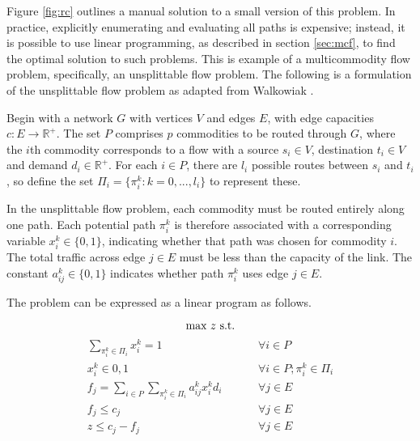 Figure \ref{fig:rc} outlines a manual solution to a small version of this problem. In practice, explicitly enumerating and evaluating all paths is expensive; instead, it is possible to use linear programming, as described in section \ref{sec:mcf}, to find the optimal solution to such problems. This is example of a multicommodity flow problem, specifically, an unsplittable flow problem. The following is a formulation of the unsplittable flow problem as adapted from Walkowiak \cite{walkowiak:residual}. 

Begin with a network $G$ with vertices $V$ and edges $E$, with edge capacities $c : E \rightarrow \mathbb{R}^+$. The set $P$ comprises $p$ commodities to be routed through $G$, where the $i$th commodity corresponds to a flow with a source $s_i \in V$, destination $t_i \in V$ and demand $d_i \in \mathbb{R}^+$. For each $i \in P$, there are $l_i$ possible routes between $s_i$ and $t_i$, so define the set $\Pi_i = \{\pi_i^k : k = 0, ..., l_i\}$ to represent these.

In the unsplittable flow problem, each commodity must be routed entirely along one path. Each potential path $\pi_i^k$ is therefore associated with a corresponding variable $x_i^k \in \{0,1\}$, indicating whether that path was chosen for commodity $i$. The total traffic across edge $j \in E$ must be less than the capacity of the link. The constant $a_{ij}^k \in \{0,1\}$ indicates whether path $\pi_i^k$ uses edge $j \in E$.

The problem can be expressed as a linear program as follows.

\begin{equation*}
	\text{max } z \text{ s.t.} \\
\end{equation*}
\begin{align}
	\sum_{\pi_i^k \in \Pi_i} x_i^k = 1 \hspace{1cm} &\forall i \in P \\
	x_i^k \in {0,1} \hspace{1cm} &\forall i \in P; \pi_i^k \in \Pi_i \\
	f_j = \sum_{i \in P} \sum_{\pi_i^k \in \Pi_i} a_{ij}^k x_i^k d_i \hspace{1cm} &\forall j \in E \\
	f_j \leq c_j \hspace{1cm} &\forall j \in E \\
	z \leq c_j - f_j \hspace{1cm} &\forall j \in E
\end{align}

